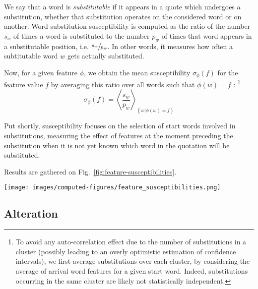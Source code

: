 We say that a word is \emph{substitutable} if it appears in a quote which undergoes a substitution, whether that substitution operates on the considered word or on another.
Word substitution susceptibility is computed as the ratio of the number $s_w$ of times a word is substituted to the number $p_w$ of times that word appears in a substitutable position, i.e. $\sfrac{s_w}{p_w}$. In other words, it measures how often a subtitutable word $w$ gets actually substituted.

Now, for a given feature $\phi$, we obtain the mean susceptibility $\sigma_{\phi}(f)$ for the feature value $f$ by averaging this ratio over all words such that $\phi(w) = f$%
:
\footnote{To avoid any auto-correlation effect due to the number of substitutions in a cluster (possibly leading to an overly optimistic estimation of confidence intervals), we first average substitutions over each cluster, by considering the average of arrival word features for a given start word.
Indeed, substitutions occurring in the same cluster are likely not statistically independent.}
$$\sigma_{\phi}(f) = \left< \frac{s_w}{p_w} \right>_{\left\lbrace w | \phi(w) = f \right\rbrace}$$

Put shortly, susceptibility focuses on the selection of start words involved in substitutions, measuring the effect of features at the moment preceding the substitution when it is not yet known which word in the quotation will be substituted.

\medskip
Results are gathered on Fig.~\ref{fig:feature-susceptibilities}.


\begin{figure*}[!th]
    \centering
    \texttt{[image: images/computed-figures/feature\_susceptibilities.png]}
    \caption{\textbf{Substitution susceptibility:} average susceptibility to substitution vs. average feature value of a candidate word for substitution, with 95\% asymptotic confidence intervals.
    Each feature exhibits a specific and significant pattern favouring either high- or low-valued words for substitution.}
    \label{fig:feature-susceptibilities}
\end{figure*}

\subsection{Alteration}

